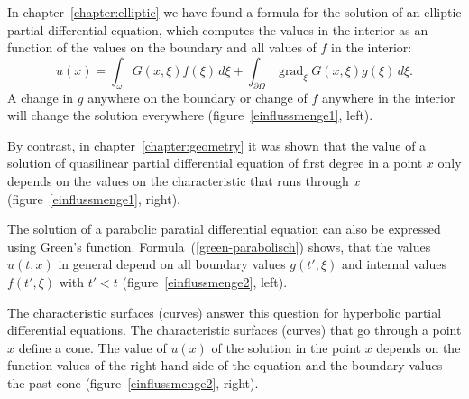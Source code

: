 In chapter~\ref{chapter:elliptic} we have found a formula for the solution
of an elliptic partial differential equation, which computes the 
values in the interior as an function of the values on the boundary
and all values of $f$ in the interior:
\[
u(x)
=
\int_\omega G(x,\xi)f(\xi)\,d\xi
+
\int_{\partial\Omega} \operatorname{grad}_\xi G(x,\xi)g(\xi)\,d\xi.
\]
A change in $g$ anywhere on the boundary or change of $f$ anywhere in the
interior will change the solution everywhere
(figure~\ref{einflussmenge1}, left).

By contrast, in chapter~\ref{chapter:geometry} it was shown that
the value of a solution of quasilinear partial differential
equation of first degree in a point $x$ only depends on the values on
the characteristic that runs through $x$
(figure~\ref{einflussmenge1}, right).

The solution of a parabolic paratial differential equation can also be
expressed using Green's function.
Formula~(\ref{green-parabolisch}) shows, that the values $u(t,x)$
in general depend on all boundary values
$g(t',\xi)$ and internal values $f(t',\xi)$
with $t'<t$ (figure~\ref{einflussmenge2}, left).

The characteristic surfaces (curves) answer this question for hyperbolic
partial differential equations.
The characteristic surfaces (curves) that go through a point $x$
define a cone.
The value of $u(x)$ of the solution in the point $x$ depends on the
function values of the right hand side of the equation and the boundary values
the past cone
(figure~\ref{einflussmenge2}, right).


